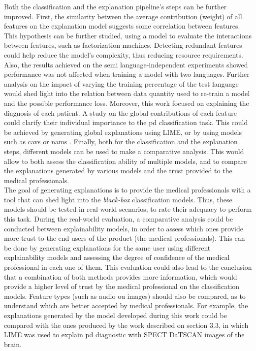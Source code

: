 Both the classification and the explanation pipeline's steps can be further improved. First, the similarity between the average contribution (weight) of all features on the explanation model suggests some correlation between features. This hypothesis can be further studied, using a model to evaluate the interactions between features, such as factorization machines. Detecting redundant features could help reduce the model's complexity, thus reducing resource requirements. Also, the results achieved on the semi language-independent experiments showed performance was not affected when training a model with two languages. Further analysis on the impact of varying the training percentage of the test language would shed light into the relation between data quantity used to re-train a model and the possible performance loss. Moreover, this work focused on explaining the diagnosis of each patient. A study on the global contributions of each feature could clarify their individual importance to the \gls{pd} classification task. This could be achieved by generating global explanations using LIME, or by using models such as \gls{cav}s \cite{TCAV} or \gls{nam}s \cite{NAM}. Finally, both for the classification and the explanation steps, different models can be used to make a comparative analysis. This would allow to both assess the classification ability of multiple models, and to compare the explanations generated by various models and the trust provided to the medical professionals. \\
The goal of generating explanations is to provide the medical professionals with a tool that can shed light into the \textit{black-box} classification models. Thus, these models should be tested in real-world scenarios, to rate their adequacy to perform this task. During the real-world evaluation, a comparative analysis could be conducted between explainability models, in order to assess which ones provide more trust to the end-users of the product (the medical professionals). This can be done by generating explanations for the same user using different explainability models and assessing the degree of confidence of the medical professional in each one of them. This evaluation could also lead to the conclusion that a combination of both methods provides more information, which would provide a higher level of trust by the medical professional on the classification models. Feature types (such as audio ou images) should also be compared, as to understand which are better accepted by medical professionals. For example, the explanations generated by the model developed during this work could be compared with the ones produced by the work described on section 3.3, in which LIME was used to explain \gls{pd} diagnostic with SPECT DaTSCAN images of the brain. 

